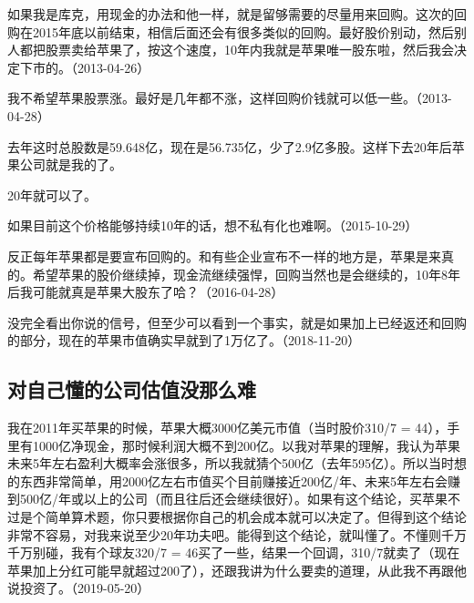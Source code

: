 
如果我是库克，用现金的办法和他一样，就是留够需要的尽量用来回购。这次的回购在2015年底以前结束，相信后面还会有很多类似的回购。最好股价别动，然后别人都把股票卖给苹果了，按这个速度，10年内我就是苹果唯一股东啦，然后我会决定下市的。（2013-04-26）


我不希望苹果股票涨。最好是几年都不涨，这样回购价钱就可以低一些。（2013-04-28）

去年这时总股数是59.648亿，现在是56.735亿，少了2.9亿多股。这样下去20年后苹果公司就是我的了。


20年就可以了。


如果目前这个价格能够持续10年的话，想不私有化也难啊。（2015-10-29）


反正每年苹果都是要宣布回购的。和有些企业宣布不一样的地方是，苹果是来真的。希望苹果的股价继续掉，现金流继续强悍，回购当然也是会继续的，10年8年后我可能就真是苹果大股东了哈？（2016-04-28）


没完全看出你说的信号，但至少可以看到一个事实，就是如果加上已经返还和回购的部分，现在的苹果市值确实早就到了1万亿了。（2018-11-20）

\subsection{对自己懂的公司估值没那么难}

我在2011年买苹果的时候，苹果大概3000亿美元市值（当时股价310/7 = 44），手里有1000亿净现金，那时候利润大概不到200亿。以我对苹果的理解，我认为苹果未来5年左右盈利大概率会涨很多，所以我就猜个500亿（去年595亿）。所以当时想的东西非常简单，用2000亿左右市值买个目前赚接近200亿/年、未来5年左右会赚到500亿/年或以上的公司（而且往后还会继续很好）。如果有这个结论，买苹果不过是个简单算术题，你只要根据你自己的机会成本就可以决定了。但得到这个结论非常不容易，对我来说至少20年功夫吧。能得到这个结论，就叫懂了。不懂则千万千万别碰，我有个球友320/7 = 46买了一些，结果一个回调，310/7就卖了（现在苹果加上分红可能早就超过200了），还跟我讲为什么要卖的道理，从此我不再跟他说投资了。（2019-05-20）

